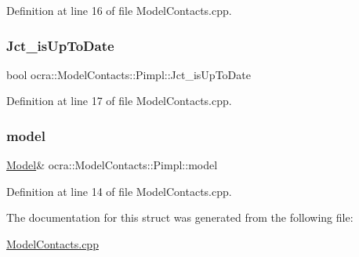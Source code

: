 Definition at line 16 of file Model\+Contacts.\+cpp.

\hypertarget{structocra_1_1ModelContacts_1_1Pimpl_ac0fa66cfb8b54718dd3a03c683819c6d}{}\label{structocra_1_1ModelContacts_1_1Pimpl_ac0fa66cfb8b54718dd3a03c683819c6d} 
\subsubsection{\texorpdfstring{Jct\+\_\+is\+Up\+To\+Date}{Jct\_isUpToDate}}
{\footnotesize\ttfamily bool ocra\+::\+Model\+Contacts\+::\+Pimpl\+::\+Jct\+\_\+is\+Up\+To\+Date}



Definition at line 17 of file Model\+Contacts.\+cpp.

\hypertarget{structocra_1_1ModelContacts_1_1Pimpl_a16998d1fe02ccbb3a3f2282d5ddc5074}{}\label{structocra_1_1ModelContacts_1_1Pimpl_a16998d1fe02ccbb3a3f2282d5ddc5074} 
\subsubsection{\texorpdfstring{model}{model}}
{\footnotesize\ttfamily \hyperlink{classocra_1_1Model}{Model}\& ocra\+::\+Model\+Contacts\+::\+Pimpl\+::model}



Definition at line 14 of file Model\+Contacts.\+cpp.



The documentation for this struct was generated from the following file\+:\begin{DoxyCompactItemize}
\item 
\hyperlink{ModelContacts_8cpp}{Model\+Contacts.\+cpp}\end{DoxyCompactItemize}
